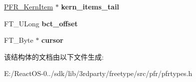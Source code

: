 \begin{DoxyCompactItemize}
\item 
\mbox{\label{struct_p_f_r___phy_font_rec___a1b6dddc77624a3f1263152d24651bf09}} 
\hyperlink{struct_p_f_r___kern_item_rec__}{P\+F\+R\+\_\+\+Kern\+Item} $\ast$ {\bfseries kern\+\_\+items\+\_\+tail}
\item 
\mbox{\label{struct_p_f_r___phy_font_rec___aab15ed917a49e40603b3c71d4a3e4150}} 
F\+T\+\_\+\+U\+Long {\bfseries bct\+\_\+offset}
\item 
\mbox{\label{struct_p_f_r___phy_font_rec___ae0b734f5e8b401801594078478c6b83c}} 
F\+T\+\_\+\+Byte $\ast$ {\bfseries cursor}
\end{DoxyCompactItemize}


该结构体的文档由以下文件生成\+:\begin{DoxyCompactItemize}
\item 
E\+:/\+React\+O\+S-\/0../sdk/lib/3rdparty/freetype/src/pfr/pfrtypes.\+h\end{DoxyCompactItemize}
